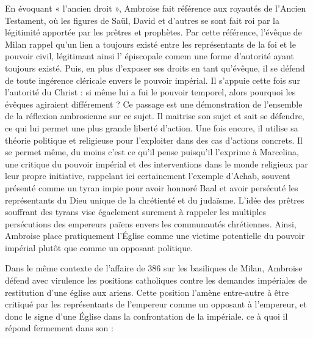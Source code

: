 En évoquant « l'ancien droit », Ambroise fait référence aux royautés de l'Ancien Testament, où les figures de Saül, David et d'autres se sont fait roi par la légitimité apportée par les prêtres et prophètes. Par cette référence, l'évêque de Milan rappel qu'un lien a toujours existé entre les représentants de la foi et le pouvoir civil, légitimant ainsi l' épiscopale comem une forme d'autorité ayant toujours existé. Puis, en plus d'exposer ses droits en tant qu'évêque, il se défend de toute ingérence cléricale envers le pouvoir impérial. Il s'appuie cette fois sur l'autorité du Christ : si même lui a fui le pouvoir temporel, alors pourquoi les évêques agiraient différement ? Ce passage est une démonstration de l'ensemble de la réflexion ambrosienne sur ce sujet. Il maitrise son sujet et sait se défendre, ce qui lui permet une plus grande liberté d'action. Une fois encore, il utilise sa théorie politique et religieuse pour l'exploiter dans des cas d'actions concrets. Il se permet même, du moins c'est ce qu'il pense puisqu'il l'exprime à Marcelina, une critique du pouvoir impérial et des interventions dans le monde religieux par leur propre initiative, rappelant ici certainement l'exemple d'Achab, souvent présenté comme un tyran impie pour avoir honnoré Baal et avoir persécuté les représentants du Dieu unique de la chrétienté et du judaïsme. L'idée des prêtres souffrant des tyrans vise égaelement surement à rappeler les multiples persécutions des empereurs païens envers les communautés chrétiennes. Ainsi, Ambroise place pratiquement l'Église comme une victime potentielle du pouvoir impérial plutôt que comme un opposant politique.

\bigskip

Dans le même contexte de l'affaire de 386 sur les basiliques de Milan, Ambroise défend avec virulence les positions catholiques contre les demandes impériales de restitution d'une église aux ariens. Cette position l'amène entre-autre à être critiqué par les représentants de l'empereur comme un opposant à l'empereur, et donc le signe d'une Église dans la confrontation de la  impériale. ce à quoi il répond fermement dans son  :

\bigskip

